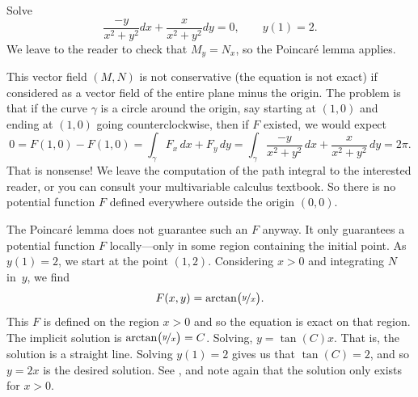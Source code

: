 \begin{example} \label{exact:examplevortex}
Solve
\begin{equation*}
\frac{-y}{x^2+y^2} dx + \frac{x}{x^2+y^2} dy = 0 , \qquad y(1) = 2.
\end{equation*}
We leave to the reader to check that
$M_y = N_x$,
so the Poincar\'e lemma applies.

This vector field $(M,N)$ is not conservative (the equation is not exact)
if considered as a vector
field of the entire plane minus the origin.  The problem is that if the curve $\gamma$
is a circle around the origin, say starting at $(1,0)$ and
ending at $(1,0)$ going counterclockwise, then if $F$ existed, we would expect
\begin{equation*}
0 = F(1,0) - F(1,0) = \int_\gamma F_x \, dx + F_y \, dy = \int_\gamma \frac{-y}{x^2+y^2} \, dx +
\frac{x}{x^2+y^2} \, dy = 2\pi .
\end{equation*}
That is nonsense!
We leave the computation of the path integral to the interested reader, or
you can consult your multivariable calculus textbook.  So there is no
potential function $F$ defined everywhere outside the origin $(0,0)$.

The Poincar\'e lemma does not guarantee such an $F$ anyway.
It only guarantees a potential function $F$ locally---only in
some region containing the initial point.  As $y(1) = 2$,
we start at the point $(1,2)$.  Considering $x > 0$ and
integrating
$N$ in~$y$, we find
\begin{equation*}
F(x,y) = \arctan \bigl( \nicefrac{y}{x} \bigr) .
\end{equation*}
This $F$ is defined on the region $x > 0$ and so the equation is exact on
that region.
The implicit solution is
$\arctan \bigl( \nicefrac{y}{x} \bigr) = C$.  Solving,
$y = \tan(C) x$.  That is, the solution is a straight line.  Solving $y(1) =
2$ gives us that $\tan(C) = 2$, and so $y= 2x$ is the desired solution.
See , and note again that the solution only exists for
$x > 0$.
\begin{myfig}
\capstart
{}
\caption{Solution to
$\frac{-y}{x^2+y^2} dx + \frac{x}{x^2+y^2} dy = 0$, $y(1) = 2$,
with initial point marked.\label{exact:y2x}}
\end{myfig}
\end{example}

